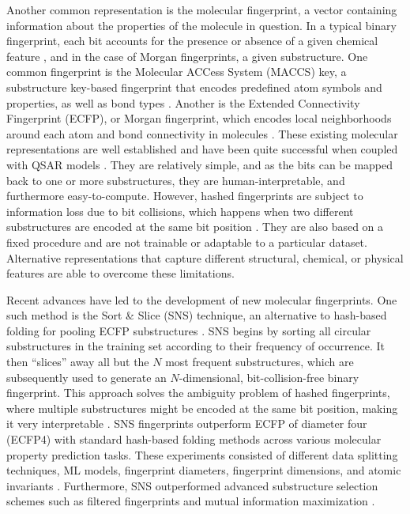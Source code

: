 Another common representation is the molecular fingerprint, a vector containing information about the properties of the molecule in question. In a typical binary fingerprint, each bit accounts for the presence or absence of a given chemical feature \citep{Fassio2022}, and in the case of Morgan fingerprints, a given substructure. One common fingerprint is the Molecular ACCess System (MACCS) key, a substructure key-based fingerprint that encodes predefined atom symbols and properties, as well as bond types \citep{Xie2020}. Another is the Extended Connectivity Fingerprint (ECFP), or Morgan fingerprint, which encodes local neighborhoods around each atom and bond connectivity in molecules \citep{Xie2020}. These existing molecular representations are well established and have been quite successful when coupled with QSAR models \citep{CortsCiriano2020, Sabando2021}. They are relatively simple, and as the bits can be mapped back to one or more substructures, they are human-interpretable, and furthermore easy-to-compute. However, hashed fingerprints are subject to information loss due to bit collisions, which happens when two different substructures are encoded at the same bit position \citep{Fassio2022}. They are also based on a fixed procedure and are not trainable or adaptable to a particular dataset. Alternative representations that capture different structural, chemical, or physical features are able to overcome these limitations. 

Recent advances have led to the development of new molecular fingerprints. One such method is the Sort \& Slice (SNS) technique, an alternative to hash-based folding for pooling ECFP substructures \citep{sns}. SNS begins by sorting all circular substructures in the training set according to their frequency of occurrence. It then ``slices'' away all but the $N$ most frequent substructures, which are subsequently used to generate an $N$-dimensional, bit-collision-free binary fingerprint. This approach solves the ambiguity problem of hashed fingerprints, where multiple substructures might be encoded at the same bit position, making it very interpretable \citep{sns}. SNS fingerprints outperform ECFP of diameter four (ECFP4) with standard hash-based folding methods across various molecular property prediction tasks. These experiments consisted of different data splitting techniques, ML models, fingerprint diameters, fingerprint dimensions, and atomic invariants \citep{sns}. Furthermore, SNS outperformed advanced substructure selection schemes such as filtered fingerprints and mutual information maximization \citep{sns}. 

